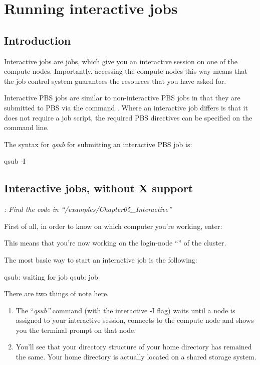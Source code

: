 \chapter{Running interactive jobs}

\section{Introduction}

Interactive jobs are jobs, which give you an interactive session on one of the
compute nodes. Importantly, accessing the compute nodes this way means that the
job control system guarantees the resources that you have asked for.

Interactive PBS jobs are similar to non-interactive PBS jobs in that they are
submitted to PBS via the command . Where an interactive job
differs is that it does not require a job script, the required PBS directives
can be specified on the command line.

The syntax for \emph{qsub} for submitting an interactive PBS job is:
\begin{prompt}
qsub -I %
\end{prompt}

\section{Interactive jobs, without X support}

\emph{: Find the code in ``\tilde/examples/Chapter05\_Interactive''}

First of all, in order to know on which computer you're working, enter:
\begin{prompt}
\end{prompt}

This means that you're now working on the login-node ``\emph{\loginnode}'' of
the \hpc cluster.

The most basic way to start an interactive job is the following:
\begin{prompt}
qsub: waiting for job %
qsub: job %
\end{prompt}

There are two things of note here.

\begin{enumerate}
  \item  The ``\emph{qsub''} command (with the interactive -I
      flag) waits until a node is assigned to your interactive session,
      connects to the compute node and shows you the terminal prompt on that
      node.
\item  You'll see that your directory structure of your home directory has
  remained the same. Your home directory is actually located on a shared
  storage system.
\end{enumerate}

